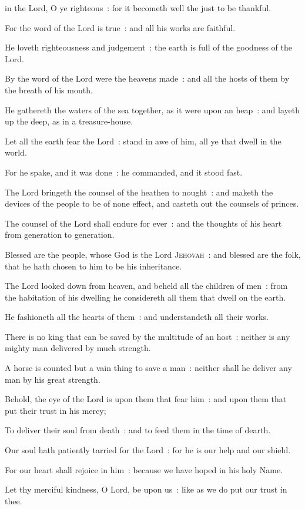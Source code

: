  in the Lord, O ye righteous~: for it becometh well the just to be thankful.\par
{}
For the word of the Lord is true~: and all his works are faithful.\par
{}He loveth righteousness and judgement~: the earth is full of the goodness of the Lord.\par
{}By the word of the Lord were the heavens made~: and all the hosts of them by the breath of his mouth.\par
{}He gathereth the waters of the sea together, as it were upon an heap~: and layeth up the deep, as in a treasure-house.\par
{}Let all the earth fear the Lord~: stand in awe of him, all ye that dwell in the world.\par
{}For he spake, and it was done~: he commanded, and it stood fast.\par
{}The Lord bringeth the counsel of the heathen to nought~: and maketh the devices of the people to be of none effect, and casteth out the counsels of princes.\par
{}The counsel of the Lord shall endure for ever~: and the thoughts of his heart from generation to generation.\par
{}Blessed are the people, whose God is the Lord \textsc{Jehovah}~: and blessed are the folk, that he hath chosen to him to be his inheritance.\par
{}The Lord looked down from heaven, and beheld all the children of men~: from the habitation of his dwelling he considereth all them that dwell on the earth.\par
{}He fashioneth all the hearts of them~: and understandeth all their works.\par
{}There is no king that can be saved by the multitude of an host~: neither is any mighty man delivered by much strength.\par
{}A horse is counted but a vain thing to save a man~: neither shall he deliver any man by his great strength.\par
{}Behold, the eye of the Lord is upon them that fear him~: and upon them that put their trust in his mercy;\par
{}To deliver their soul from death~: and to feed them in the time of dearth.\par
{}Our soul hath patiently tarried for the Lord~: for he is our help and our shield.\par
{}For our heart shall rejoice in him~: because we have hoped in his holy Name.\par
{}Let thy merciful kindness, O Lord, be upon us~: like as we do put our trust in thee.\par

